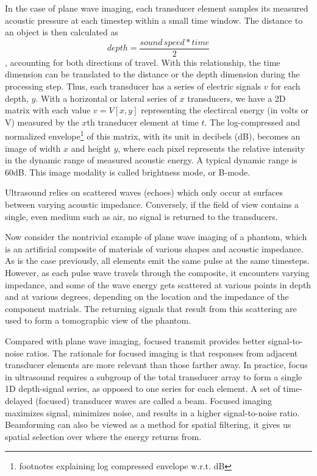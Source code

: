  In the case of plane wave imaging, each transducer element samples its measured acoustic pressure at each timestep within a small time window. The distance to an object is then calculated as
 $$depth = \frac{sound\,speed * time}{2}$$ %
 , accounting for both directions of travel. With this relationship, the time dimension can be translated to the distance or the depth dimension during the processing step. Thus, each transducer has a series of electric signals $v$ for each depth, $y$. With a horizontal or lateral series of $x$ transducers, we have a 2D matrix with each value $v = V[x, y]$ representing the electircal energy (in volts or V) measured by the $x$th transducer element at time $t$. The log-compressed and normalized envelope\footnote{footnotes explaining log compressed envelope w.r.t. dB} of this matrix, with its unit in decibels (dB), becomes an image of width $x$ and height $y$, where each pixel represents the relative intensity in the dynamic range of measured acoustic energy. A typical dynamic range is 60dB. This image modality is called brightness mode, or B-mode. %

 Ultrasound relies on scattered waves (echoes) which only occur at surfaces between varying acoustic impedance. Conversely, if the field of view contains a single, even medium such as air, no signal is returned to the transducers.

 Now consider the nontrivial example of plane wave imaging of a phantom, which is an artificial composite of materials of various shapes and acoustic impedance. As is the case previously, all elements emit the same pulse at the same timesteps. However, as each pulse wave travels through the composite, it encounters varying impedance, and some of the wave energy gets scattered at various points in depth and at various degrees, depending on the location and the impedance of the component matrials. The returning signals that result from this scattering are used to form a tomographic view of the phantom.

 Compared with plane wave imaging, focused transmit provides better signal-to-noise ratios. The rationale for focused imaging is that responses from adjacent transducer elements are more relevant than those farther away. In practice, focus in ultrasound requires a subgroup of the total transducer array to form a single 1D depth-signal series, as opposed to one series for each element. A set of time-delayed (focused) transducer waves are called a beam. Focused imaging maximizes signal, minimizes noise, and results in a higher signal-to-noise ratio. Beamforming can also be viewed as a method for spatial filtering, it gives us spatial selection over where the energy returns from.

